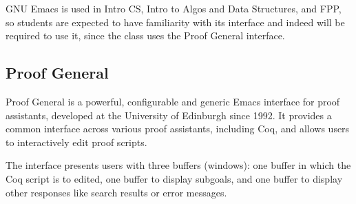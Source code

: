 GNU Emacs is used in Intro CS, Intro to Algos and Data Structures, and FPP, so students are expected to have familiarity with its interface and indeed will be required to use it, since the class uses the Proof General interface. 


\subsection{Proof General}   
Proof General is a powerful, configurable and generic Emacs interface for proof assistants, developed at the University of Edinburgh since 1992. It provides a common interface across various proof assistants, including Coq, and allows users to interactively edit proof scripts. 

The interface presents users with three buffers (windows): one buffer in which the Coq script is to edited, one buffer to display subgoals, and one buffer to display other responses like search results or error messages.
